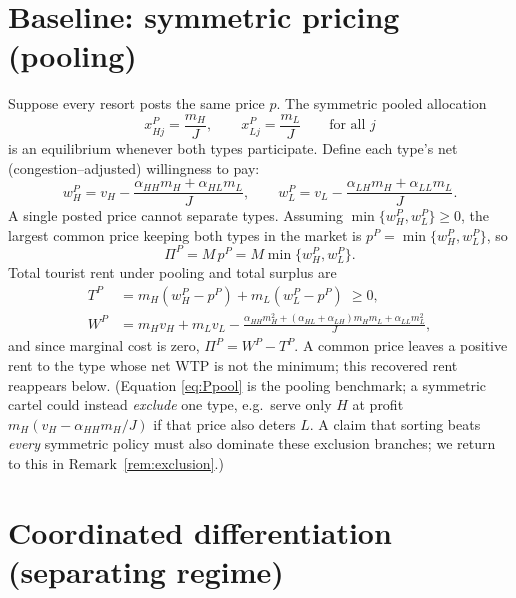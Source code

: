 \documentclass[11pt]{article}
\theoremstyle{plain}
\theoremstyle{definition}
\theoremstyle{remark}
\newcommand{\mH}{m_{H}}
\newcommand{\mL}{m_{L}}
\newcommand{\vH}{v_{H}}
\newcommand{\vL}{v_{L}}
\newcommand{\aHH}{\alpha_{HH}}
\newcommand{\aHL}{\alpha_{HL}}
\newcommand{\aLH}{\alpha_{LH}}
\newcommand{\aLL}{\alpha_{LL}}
\newcommand{\WP}{W^{P}}
\newcommand{\TP}{T^{P}}
\newcommand{\PiP}{\Pi^{P}}
\newcommand{\wHP}{w_{H}^{P}}
\newcommand{\wLP}{w_{L}^{P}}
\begin{document}
\section{Baseline: symmetric pricing (pooling)}\label{sec:pool}

Suppose every resort posts the same price $p$. The symmetric pooled allocation
\begin{equation}
x_{Hj}^{P}=\frac{\mH}{J},\qquad x_{Lj}^{P}=\frac{\mL}{J}\qquad\text{for all }j
\end{equation}
is an equilibrium whenever both types participate. Define each type's net (congestion--adjusted)
willingness to pay:
\begin{equation}
\wHP = \vH - \frac{\aHH\mH+\aHL\mL}{J},
\qquad
\wLP = \vL - \frac{\aLH\mH+\aLL\mL}{J}.
\label{eq:wpool}
\end{equation}
A single posted price cannot separate types. Assuming $\min\{\wHP,\wLP\}\ge0$, the largest
common price keeping both types in the market is $p^{P}=\min\{\wHP,\wLP\}$, so
\begin{equation}
\boxed{\ \PiP = M\,p^{P} = M\min\{\wHP,\wLP\}. \ }
\label{eq:Ppool}
\end{equation}
Total tourist rent under pooling and total surplus are
\begin{align}
\TP &= \mH(\wHP-p^{P})+\mL(\wLP-p^{P}) \;\ge 0, \label{eq:Tpool}\\
\WP &= \mH\vH+\mL\vL-\frac{\aHH\mH^2+(\aHL+\aLH)\mH\mL+\aLL\mL^2}{J},
\end{align}
and since marginal cost is zero, $\PiP=\WP-\TP$. A common price leaves a positive rent to the
type whose net WTP is not the minimum; this recovered rent reappears below. (Equation
\eqref{eq:Ppool} is the pooling benchmark; a symmetric cartel could instead \emph{exclude} one
type, e.g.\ serve only $H$ at profit $\mH(\vH-\aHH\mH/J)$ if that price also deters $L$. A claim
that sorting beats \emph{every} symmetric policy must also dominate these exclusion branches; we
return to this in Remark~\ref{rem:exclusion}.)

\section{Coordinated differentiation (separating regime)}\label{sec:sort}
\end{document}
